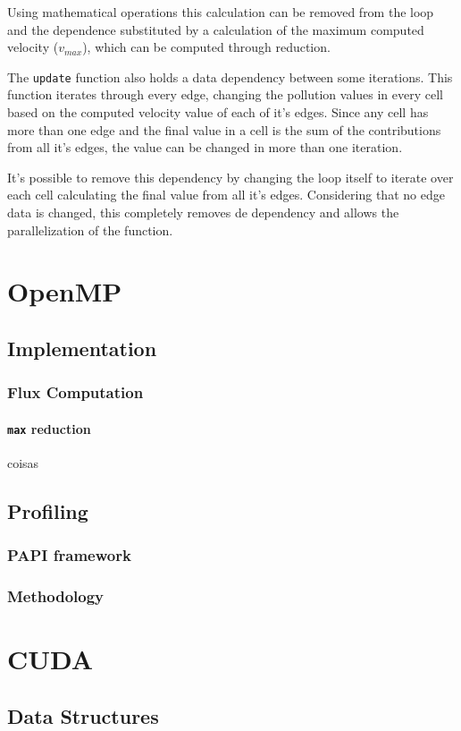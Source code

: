 \documentclass[9pt,twocolumn]{scrartcl}
\newcommand{\paragraphh}[1]{\paragraph{#1\hfill}\hfill

}
\begin{document}
Using mathematical operations this calculation can be removed from the loop and the dependence substituted by a calculation of the maximum computed velocity ($v_{max}$), which can be computed through reduction.

The \texttt{update} function also holds a data dependency between some iterations. This function iterates through every edge, changing the pollution values in every cell based on the computed velocity value of each of it's edges. Since any cell has more than one edge and the final value in a cell is the sum of the contributions from all it's edges, the value can be changed in more than one iteration.

It's possible to remove this dependency by changing the loop itself to iterate over each cell calculating the final value from all it's edges. Considering that no edge data is changed, this completely removes de dependency and allows the parallelization of the function.

\section{OpenMP}
\label{sec:openmp}
\subsection{Implementation}
\subsubsection{Flux Computation}
\paragraphh{\texttt{max} reduction}
coisas
\subsection{Profiling}
\subsubsection{PAPI framework}%
\subsubsection{Methodology}%

\section{CUDA}
\label{sec:cuda}
\subsection{Data Structures}
\end{document}
